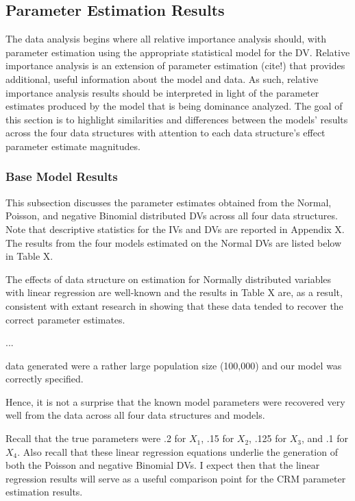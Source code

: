 \documentclass[ShortAfour,times,sageapa]{sagej}
\begin{document}
	\subsection{Parameter Estimation Results}
	
	The data analysis begins where all relative importance analysis should, with parameter estimation using the appropriate statistical model for the DV.  
	Relative importance analysis is an extension of parameter estimation (cite!) that provides additional, useful information about the model and data.  
	As such, relative importance analysis results should be interpreted in light of the parameter estimates produced by the model that is being dominance analyzed.  
	The goal of this section is to highlight similarities and differences between the models' results across the four data structures with attention to each data structure's effect parameter estimate magnitudes. 
	
		\subsubsection{Base Model Results}
	
	This subsection discusses the parameter estimates obtained from the Normal, Poisson, and negative Binomial distributed DVs across all four data structures.  
	Note that descriptive statistics for the IVs and DVs are reported in Appendix X.  The results from the four models estimated on the Normal DVs are listed below in Table X.
	
	
	
	The effects of data structure on estimation for Normally distributed variables with linear regression are well-known and the results in Table X are, as a result, consistent with extant research in showing that these data tended to recover the correct parameter estimates.
	
	...
	
	 data generated were a rather large population size (100,000) and our model was correctly specified.  
	
	Hence, it is not a surprise that the known model parameters were recovered very well from the data across all four data structures and models.
	
	Recall that the true parameters were .2 for $X_1$, .15 for $X_2$, .125 for $X_3$, and .1 for $X_4$.  
	Also recall that these linear regression equations underlie the generation of both the Poisson and negative Binomial DVs.  
	I expect then that the linear regression results will serve as a useful comparison point for the CRM parameter estimation results.
	
\end{document}

